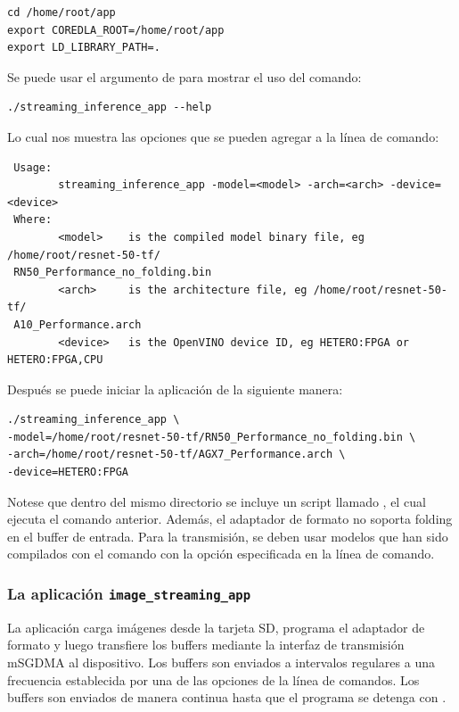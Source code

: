     \begin{lstlisting}
cd /home/root/app
export COREDLA_ROOT=/home/root/app
export LD_LIBRARY_PATH=.    \end{lstlisting}

    Se puede usar el argumento  de  para mostrar el uso del comando:

    \begin{lstlisting}
./streaming_inference_app --help    \end{lstlisting}

    Lo cual nos muestra las opciones que se pueden agregar a la l\'inea de comando:

    \begin{lstlisting}
 Usage:
        streaming_inference_app -model=<model> -arch=<arch> -device=<device>
 Where:
        <model>    is the compiled model binary file, eg /home/root/resnet-50-tf/
 RN50_Performance_no_folding.bin
        <arch>     is the architecture file, eg /home/root/resnet-50-tf/
 A10_Performance.arch
        <device>   is the OpenVINO device ID, eg HETERO:FPGA or HETERO:FPGA,CPU    \end{lstlisting}

    Despu\'es se puede iniciar la aplicaci\'on de la siguiente manera:

    \begin{lstlisting}
./streaming_inference_app \
-model=/home/root/resnet-50-tf/RN50_Performance_no_folding.bin \
-arch=/home/root/resnet-50-tf/AGX7_Performance.arch \
-device=HETERO:FPGA    \end{lstlisting}

    Notese que dentro del mismo directorio se incluye un script llamado , el cual ejecuta el comando anterior. 
    Adem\'as, el adaptador de formato no soporta folding en el buffer de entrada. Para la transmisi\'on, se deben usar modelos que han sido compilados con el comando  con la opci\'on  especificada en la línea de comando.

\subsubsection{La aplicaci\'on \texttt{image\_streaming\_app}}

    La aplicaci\'on  carga im\'agenes desde la tarjeta SD, programa el adaptador de formato y luego transfiere los buffers mediante la interfaz de transmisi\'on mSGDMA al dispositivo. Los buffers son enviados a intervalos regulares a una frecuencia establecida por una de las opciones de la l\'inea de comandos. Los buffers son enviados de manera continua hasta que el programa se detenga con .

